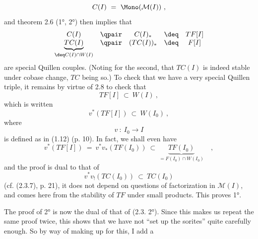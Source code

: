 \[ C(I) \ = \ \Mono(\mathcal{M}(I))\ , \]
and theorem 2.6 (1°, 2°) then implies that
\[ \begin{array}{ccccc}
C(I) & \qpair & C(I)_* & \deq & TF[I]\\
\underbrace{TC(I)}_{\deq C(I)\cap W(I)} & \qpair & (TC(I))_* & \deq & F[I]
\end{array} \] %
are special Quillen couples. (Noting for the second, that $TC(I)$ is indeed  stable under cobase change, $TC$ being so.) To check that we have a very special Quillen triple, it remains by virtue of 2.8 to check that
\[ TF[I] \ \subset\ W(I)\ , \]
which is written
\[ v^*(TF[I]) \ \subset\ W(I_0)\ , \]
where
\[ v \ :\ I_0 \longrightarrow I \]
is defined as in (1.12) (p. 10). In fact, we shall even have
\[ v^*(TF[I]) \ = \ v^*v_*(TF(I_0)) \ \subset\ \underbrace{TF(I_0)}_{= F(I_0)\cap W(I_0)}\quad , \]
and the proof is dual to that of
\[ v^*v_!(TC(I_0)) \ \subset\ TC(I_0) \]
(cf. (2.3.7), p. 21), it does not depend on questions of factorization in $\mathcal{M}(I)$, and comes here from the stability of $TF$ under small products. This proves 1°.

The proof of 2° is now the dual of that of (2.3. 2°). Since this makes us repeat the same proof twice, this shows that we have not ``set up the sorites'' quite carefully enough. So by way of making up for this, I add a